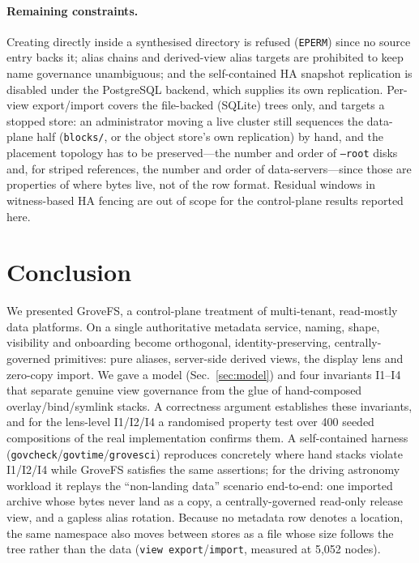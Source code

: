 \documentclass[numberedsection,acmtos]{acmart}
\begin{document}
\paragraph{Remaining constraints.}
Creating directly inside a synthesised directory is refused (\texttt{EPERM})
since no source entry backs it; alias chains and derived-view alias targets are
prohibited to keep name governance unambiguous; and the self-contained HA
snapshot replication is disabled under the PostgreSQL backend,
which supplies its own replication. Per-view export/import covers the
file-backed (SQLite) trees only, and targets a stopped store: an
administrator moving a live cluster still sequences the data-plane half
(\texttt{blocks/}, or the object store's own replication) by hand, and the
placement topology has to be preserved---the number and order of \texttt{--root}
disks and, for striped references, the number and order of data-servers---since
those are properties of where bytes live, not of the row format. Residual
windows in witness-based HA fencing are out of scope for the control-plane
results reported here.

\section{Conclusion}
We presented GroveFS, a control-plane treatment of multi-tenant, read-mostly
data platforms. On a single authoritative metadata service, naming, shape,
visibility and onboarding become orthogonal, identity-preserving,
centrally-governed primitives: pure aliases, server-side derived views, the
display lens and zero-copy import. We gave a
model (Sec.~\ref{sec:model}) and four invariants I1--I4 that
separate genuine view governance from the glue of hand-composed
overlay/bind/symlink stacks. A correctness argument establishes
these invariants, and for the lens-level I1/I2/I4 a randomised
property test over 400 seeded compositions of the real implementation confirms
them. A self-contained harness
(\texttt{govcheck}/\texttt{govtime}/\texttt{grovesci}) reproduces concretely where
hand stacks violate I1/I2/I4 while GroveFS satisfies the same assertions; for
the driving astronomy workload it replays the ``non-landing data'' scenario
end-to-end: one imported archive whose bytes never land as a copy, a
centrally-governed read-only release view, and a gapless alias rotation. Because
no metadata row denotes a location, the same namespace also moves between
stores as a file whose size follows the tree rather than the data
(\texttt{view export}/\texttt{import}, measured at 5{,}052 nodes).
\end{document}
